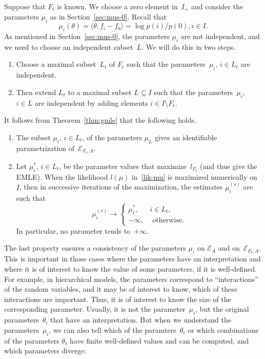 \documentclass[aos,noinfoline]{imsart}
\def\<{\langle}
\def\>{\rangle}
\def\t{\theta}
\newcommand{\Ecal}{\mathcal{E}}
\theoremstyle{remark}
\theoremstyle{definition}
\begin{document}
Suppose that $F_{t}$ is known.  We choose a zero element in~$I_{+}$ and consider the parameters $\mu_{i}$ as in
Section~\ref{sec:mus-0}.  Recall that
\begin{equation*}
  \mu_{i}(\theta) = \<\t, f_{i}-f_{0}\> = \log p(i)/p(0), i\in I.
\end{equation*}
As mentioned in Section~\ref{sec:mus-0}, the parameters $\mu_{i}$ are not independent, and we need to choose an independent subset~$L$.  We will do this in two steps.
\begin{enumerate}
\item Choose a maximal subset~$L_{t}$ of $F_{t}$ such that the parameters~$\mu_{i}$, $i\in L_{t}$ are independent.
\item Then extend $L_{t}$ to a maximal subset $L\subseteq I$ such that the parameters~$\mu_{i}$, $i\in L$ are
  independent by adding elements $i\in I\setminus F_{t}$.
\end{enumerate}
It follows from Theorem~\ref{thm:gmle} that the following holds.
\begin{enumerate}
\item The subset $\mu_{i}$, $i\in L_{t}$, of the parameters $\mu_{L}$ gives an identifiable parametrization
  of~$\Ecal_{F_{t},A}$.
\item Let $\mu^{*}_{i}$, $i\in L_{t}$, be the parameter values that maximize~$l_{F_{t}}$ (and thus give the EMLE).  When
  the likelihood $l(\mu)$ in~\eqref{lik-mu} is maximized numerically on~$I$, then in successive iterations of the
  maximization, the estimates $\mu^{(s)}_i$ are such that
  \begin{equation*}
    \mu^{(s)}_{i} \to
    \begin{cases}
      \mu^{*}_{i}, & i\in L_{t}, \\
      -\infty, & \text{ otherwise.}
    \end{cases}
  \end{equation*}
  In particular, no parameter tends to~$+\infty$.
\end{enumerate}
The last property ensures a consistency of the parameters $\mu_{i}$ on $\Ecal_{A}$ and on~$\Ecal_{F_{t},A}$.  This is
important in those cases where the parameters have an interpretation and where it is of interest to know the value of
some parameters, if it is well-defined.  For example, in hierarchical models, the parameters correspond to
``interactions'' of the random variables, and it may be of interest to know, which of these interactions are important.
Thus, it is of interest to know the size of the corresponding parameter.  Usually, it is not the parameter~$\mu_{i}$,
but the original parameters~$\theta_{i}$ that have an interpretation.  But when we understand the parameters~$\mu_{i}$,
we can also tell which of the paramters~$\theta_{i}$ or which combinations of the parameters $\theta_{i}$ have finite
well-defined values and can be computed, and which parameters diverge:
\end{document}
